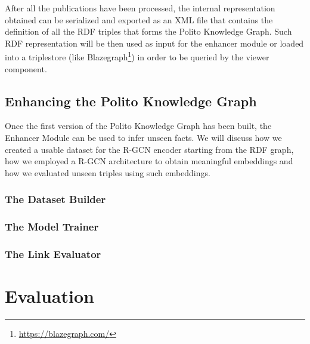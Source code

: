 \documentclass[%
    corpo=13.5pt,
    twoside,
    oldstyle,
    tipotesi=magistrale,
    greek,
    evenboxes
]{toptesi}
\begin{document}
\newpage

After all the publications have been processed, the internal representation
obtained can be serialized and exported as an XML file that contains the
definition of all the RDF triples that forms the Polito Knowledge Graph.
Such RDF representation will be then used as input for the enhancer module or
loaded into a triplestore (like
Blazegraph\footnote{\url{https://blazegraph.com/}}) in order to be queried by
the viewer component.




\section{Enhancing the Polito Knowledge Graph}

Once the first version of the Polito Knowledge Graph has been built, the
Enhancer Module can be used to infer unseen facts. We will discuss how we
created a usable dataset for the R-GCN encoder starting from the RDF graph,
how we employed a R-GCN architecture to obtain meaningful embeddings and how
we evaluated unseen triples using such embeddings.

\subsection{The Dataset Builder}



\subsection{The Model Trainer}

\subsection{The Link Evaluator}



\chapter{Evaluation}




\end{document}
